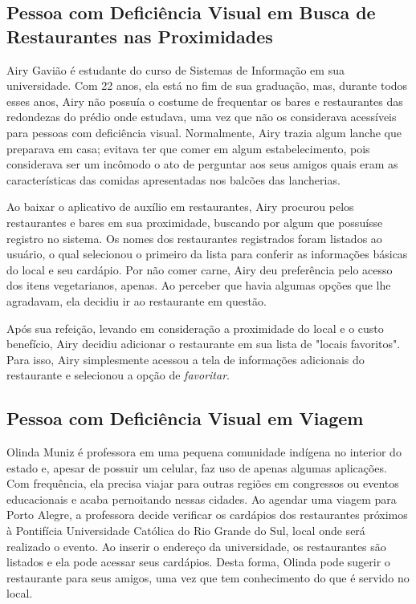 \subsection{Pessoa com Deficiência Visual em Busca de Restaurantes nas Proximidades}
Airy Gavião é estudante do curso de Sistemas de Informação em sua universidade. Com 22 anos, ela está no fim de sua graduação, mas, durante todos esses anos, Airy não possuía o costume de frequentar os bares e restaurantes das redondezas do prédio onde estudava, uma vez que não os considerava acessíveis para pessoas com deficiência visual. Normalmente, Airy trazia algum lanche que preparava em casa; evitava ter que comer em algum estabelecimento, pois considerava ser um incômodo o ato de perguntar aos seus amigos quais eram as características das comidas apresentadas nos balcões das lancherias. 

Ao baixar o aplicativo de auxílio em restaurantes, Airy procurou pelos restaurantes e bares em sua proximidade, buscando por algum que possuísse registro no sistema. Os nomes dos restaurantes registrados foram listados ao usuário, o qual selecionou o primeiro da lista para conferir as informações básicas do local e seu cardápio. Por não comer carne, Airy deu preferência pelo acesso dos itens vegetarianos, apenas. Ao perceber que havia algumas opções que lhe agradavam, ela decidiu ir ao restaurante em questão.

Após sua refeição, levando em consideração a proximidade do local e o custo benefício, Airy decidiu adicionar o restaurante em sua lista de "locais favoritos". Para isso, Airy simplesmente acessou a tela de informações adicionais do restaurante e selecionou a opção de \emph{favoritar}.

\subsection{Pessoa com Deficiência Visual em Viagem}
Olinda Muniz é professora em uma pequena comunidade indígena no interior do estado e, apesar de possuir um celular, faz uso de apenas algumas aplicações. Com frequência, ela precisa viajar para outras regiões em congressos ou eventos educacionais e acaba pernoitando nessas cidades. Ao agendar uma viagem para Porto Alegre, a professora decide verificar os cardápios dos restaurantes próximos à Pontifícia Universidade Católica do Rio Grande do Sul, local onde será realizado o evento. Ao inserir o endereço da universidade, os  restaurantes são listados e ela pode acessar seus cardápios. Desta forma, Olinda pode sugerir o restaurante para seus amigos, uma vez que tem conhecimento do que é servido no local. 

